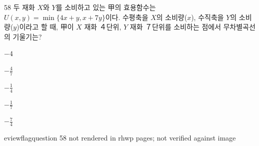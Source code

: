 \begin{question}{58}
두 재화 $X$와 $Y$를 소비하고 있는 甲의 효용함수는 $U(x, y)=\min\{4x+y, x+7y\}$이다. 수평축을 $X$의 소비량($x$), 수직축을 $Y$의 소비량($y$)이라고 할 때, 甲이 $X$ 재화 ４단위, $Y$ 재화 ７단위를 소비하는 점에서 무차별곡선의 기울기는?
\begin{choices}
  \item $-4$
  \item $- \frac{ 4 } { 7 }$
  \item $- \frac{ 1 } { 4 }$
  \item $- \frac{ 1 } { 7 }$
  \item $- \frac{ 7 } { 4 }$
\end{choices}

eviewflag{question 58 not rendered in rhwp pages; not verified against image}
\end{question}
